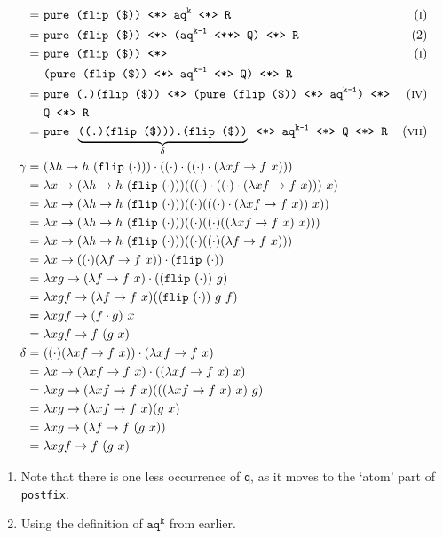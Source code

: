 \begin{align*}
    =\ & \texttt{pure (flip (\$)) \ap aq}^\texttt{k}\texttt{ \ap R} & \equi[1] \\
    =\ & \texttt{pure (flip (\$)) \ap (aq}^\texttt{k-1}\texttt{ \pa Q) \ap R} & \text{(2)} \\
    =\ & \texttt{pure (flip (\$)) \ap} & \equi[1] \\
    & \texttt{(pure (flip (\$)) \ap aq}^\texttt{k-1}\texttt{ \ap Q) \ap R} \\
    =\ & \texttt{pure (.)(flip (\$)) \ap (pure (flip (\$)) \ap aq}^\texttt{k-1}\texttt{) \ap} & \equi[4] \\
    & \texttt{Q \ap R} \\
    =\ & \texttt{pure }\underbrace{\texttt{((.)(flip (\$))).(flip (\$))}}_{\delta}\texttt{ \ap aq}^\texttt{k-1}\texttt{ \ap Q \ap R} & \equi[7] \\
    \gamma =\ & (\lambda h \to h\ (\texttt{flip}\ (\cdot))) \cdot ((\cdot) \cdot ((\cdot) \cdot (\lambda xf \to f\ x))) \\
    =\ & \lambda x \to (\lambda h \to h\ (\texttt{flip}\ (\cdot))) (((\cdot) \cdot ((\cdot) \cdot (\lambda xf \to f\ x)))\ x) \\
    =\ & \lambda x \to (\lambda h \to h\ (\texttt{flip}\ (\cdot))) ((\cdot) (((\cdot) \cdot (\lambda xf \to f\ x))\ x )) \\
    =\ & \lambda x \to (\lambda h \to h\ (\texttt{flip}\ (\cdot))) ((\cdot) ((\cdot) ((\lambda xf \to f\ x)\ x))) \\
    =\ & \lambda x \to (\lambda h \to h\ (\texttt{flip}\ (\cdot))) ((\cdot) ((\cdot) (\lambda f \to f\ x))) \\
    =\ & \lambda x \to ((\cdot) (\lambda f \to f\ x)) \cdot (\texttt{flip}\ (\cdot)) \\
    =\ & \lambda xg \to (\lambda f \to f\ x) \cdot ((\texttt{flip}\ (\cdot))\ g) \\
    =\ & \lambda xgf \to (\lambda f \to f\ x) ((\texttt{flip}\ (\cdot))\ g\ f) \\
    =\ & \lambda xgf \to (f \cdot g)\ x \\
    =\ & \lambda xgf \to f\ (g\ x) \\
    \delta =\ & ((\cdot) (\lambda xf \to f\ x)) \cdot (\lambda xf \to f\ x) \\
    =\ & \lambda x \to (\lambda xf \to f\ x) \cdot ((\lambda xf \to f\ x)\ x) \\
    =\ & \lambda xg \to (\lambda xf \to f\ x) (((\lambda xf \to f\ x)\ x)\ g) \\
    =\ & \lambda xg \to (\lambda xf \to f\ x) (g\ x) \\
    =\ & \lambda xg \to (\lambda f \to f\ (g\ x)) \\
    =\ & \lambda xgf \to f\ (g\ x)
\end{align*}
\begin{enumerate}[(1)]
    \itemsep0em
    \item Note that there is one less occurrence of \texttt{q}, as it moves to the `atom' part of \texttt{postfix}.
    \item Using the definition of $\texttt{aq}^\texttt{k}$ from earlier.
\end{enumerate}

